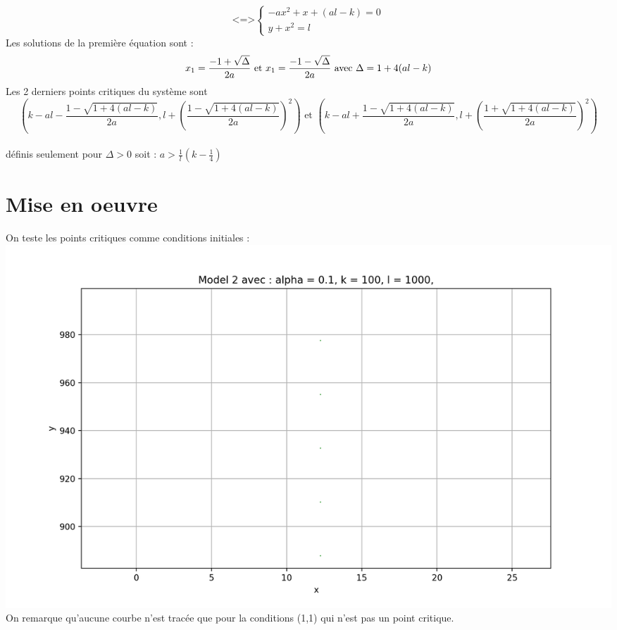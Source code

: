 \documentclass{article}
\begin{document}
$$
 \text{<=>}
\left\{
\begin{array}{ll}
-ax^{2}  +x + (al -k) =0\\
y + x^{2} = l
\end{array}
\right.
$$
Les solutions de la première équation sont :  
$$
x_{1} = \frac{-1 + \sqrt{\Delta}}{2a}  \text{ et } x_{1} = \frac{-1 - \sqrt{\Delta}}{2a}
\text{  avec  }  \Delta = 1 + 4(al -k)\\
$$
Les 2 derniers points critiques du système sont
$$
(k-al -  \frac{1 - \sqrt{ 1 + 4(al -k)}}{2a},l +  (\frac{1 - \sqrt{ 1 + 4(al -k)}}{2a})^{2}) \text{ et } (k-al +  \frac{1 - \sqrt{ 1 + 4(al -k)}}{2a},l +  (\frac{1 + \sqrt{ 1 + 4(al -k)}}{2a})^{2})
$$ 
\\définis seulement pour $\Delta > 0$ soit : $a > \frac{1}{l}(k - \frac{1}{4})$
\section{Mise en oeuvre}
On teste les points critiques comme conditions initiales : \\
\includegraphics[scale = 0.4]{../../pysrc/img/Model_2} \\
On remarque qu'aucune courbe n'est tracée que pour la conditions (1,1) qui n'est pas un point critique.
\end{document}
